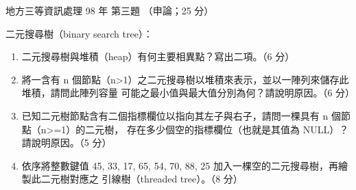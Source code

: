 \begin{pastexam}[label={px:df3-098-ds-03}]{地方三等資訊處理 98 年 第三題}
（申論；25 分）

二元搜尋樹（binary search tree）：
\begin{enumerate}[leftmargin=2.2em]
\item[㈠] 二元搜尋樹與堆積（heap）有何主要相異點？寫出二項。（6 分）
\item[㈡] 將一含有 n 個節點（n>1）之二元搜尋樹以堆積來表示，並以一陣列來儲存此堆積，請問此陣列容量
可能之最小值與最大值分別為何？請說明原因。（6 分）
\item[㈢] 已知二元樹節點含有二個指標欄位以指向其左子與右子，請問一棵具有 n 個節點（n>=1）的二元樹，
存在多少個空的指標欄位（也就是其值為 NULL）？請說明原因。（5 分）
\item[㈣] 依序將整數鍵值 45, 33, 17, 65, 54, 70, 88, 25 加入一棵空的二元搜尋樹，再繪製此二元樹對應之
引線樹（threaded tree）。（8 分）
\end{enumerate}
\end{pastexam}

